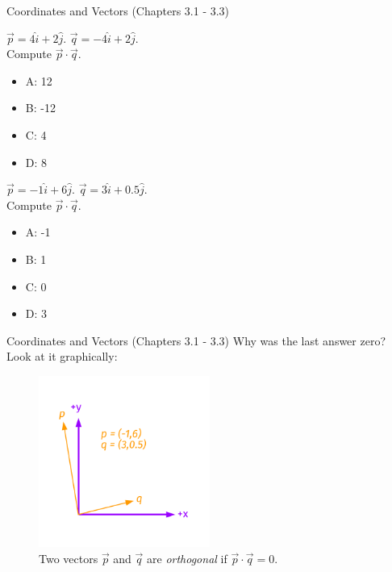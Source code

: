 \documentclass{beamer}
\begin{document}
\begin{frame}{Coordinates and Vectors (Chapters 3.1 - 3.3)}
\small
\begin{minipage}[b]{0.45\linewidth}
$\vec{p} = 4\hat{i}+2\hat{j}$.  $\vec{q} = -4\hat{i}+2\hat{j}$.  \\
Compute $\vec{p} \cdot \vec{q}$.
\vspace{0.2cm}
\begin{itemize}
\item A: 12
\item B: -12
\item C: 4
\item D: 8
\end{itemize}
\end{minipage}
\hspace{0.5cm}
\begin{minipage}[b]{0.45\linewidth}
$\vec{p} = -1\hat{i}+6\hat{j}$.  $\vec{q} = 3\hat{i}+0.5\hat{j}$.  \\
Compute $\vec{p} \cdot \vec{q}$.
\vspace{0.2cm}
\begin{itemize}
\item A: -1
\item B: 1
\item C: 0
\item D: 3
\end{itemize}
\end{minipage}
\end{frame}

\begin{frame}{Coordinates and Vectors (Chapters 3.1 - 3.3)}
Why was the last answer zero?  Look at it graphically:
\begin{figure}
\centering
\includegraphics[width=0.5\textwidth,trim=1cm 1cm 1cm 1cm,clip=true]{figures/Vectors5.pdf}
\caption{\label{fig:twovectors4} Two vectors $\vec{p}$ and $\vec{q}$ are \textit{orthogonal} if $\vec{p} \cdot \vec{q} = 0$.}
\end{figure}
\end{frame}
\end{document}
